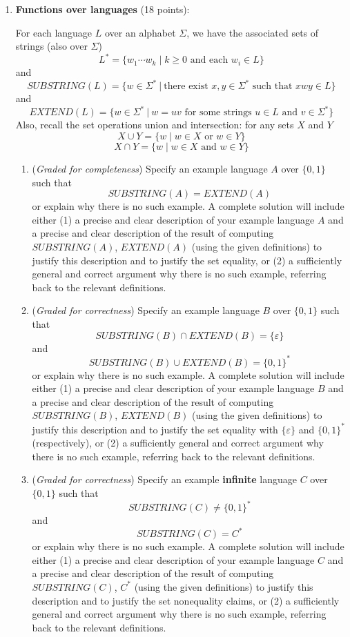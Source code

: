 \documentclass[12pt, oneside]{article}
\newcommand{\gradeCorrect}{({\it Graded for correctness}) }
\newcommand{\gradeComplete}{({\it Graded for completeness}) }
\begin{document}
\begin{enumerate}[wide, labelwidth=!, labelindent=0pt]
\item\textbf{Functions over languages} (18 points):

For each language $L$ over an alphabet $\Sigma$, we have the 
associated sets of strings (also over $\Sigma$)
\[
    L^* = \{ w_1 \cdots w_k \mid k \geq 0 \textrm{ and each } w_i \in L\}
\]
and
\[
    SUBSTRING(L) = \{ w \in \Sigma^* ~|~ \text{there exist } x,y \in \Sigma^* \text{ such that } xwy \in L\}
\]
and 
\[
    EXTEND(L) = \{ w \in \Sigma^* ~|~ w = uv \text{ for some strings } u \in L \text{ and } v \in \Sigma^* \}
\]
Also, recall the set operations union and intersection: for any sets $X$ and $Y$
\[
X \cup Y = \{ w \mid w \in X \text{ or } w \in Y \}
\]
\[
X \cap Y = \{ w \mid w \in X \text{ and } w \in Y \}
\]

    \begin{enumerate}
    \item\gradeComplete Specify an example language $A$ over $\{0,1\}$ such that 
    $$SUBSTRING(A) = EXTEND(A)$$
    or explain why there is no such example. 
    A complete solution will include either (1) a precise and
    clear description of your example language $A$ 
    and a precise and clear description of
    the result of computing $SUBSTRING(A)$, $EXTEND(A)$ (using the given definitions)
    to justify this description and to justify the set equality,
    or (2) a sufficiently general and correct argument
    why there is no such example, referring back to the relevant definitions.

    \item\gradeCorrect Specify an example language $B$ over $\{0,1\}$ such that 
    $$SUBSTRING(B) \cap EXTEND(B) = \{\varepsilon\}$$ and $$SUBSTRING(B) \cup EXTEND(B) = \{0,1\}^*$$
    or explain why there is no such example. 
    A complete solution will include either (1) a precise and
    clear description of your example language $B$ 
    and a precise and clear description of
    the result of computing $SUBSTRING(B)$, $EXTEND(B)$ (using the given definitions)
    to justify this description and to justify the set equality with 
    $\{\varepsilon\}$ and $\{0,1\}^*$ (respectively), or (2) a sufficiently general and correct argument
    why there is no such example, referring back to the relevant definitions.

    \item\gradeCorrect Specify an example {\bf infinite} language $C$ over $\{0,1\}$ such that 
    $$SUBSTRING(C) \neq \{0,1\}^*$$ and $$SUBSTRING(C) = C^*$$or 
    explain why there is no such example.
    A complete solution will include either (1) a precise and
    clear description of your example language $C$ 
    and a precise and clear description of
    the result of computing $SUBSTRING(C)$, $C^*$ (using the given definitions)
    to justify this description and to justify the set nonequality claims, 
    or (2) a sufficiently general and correct argument
    why there is no such example, referring back to the relevant definitions.



\end{enumerate}
\end{enumerate}
\end{document}
